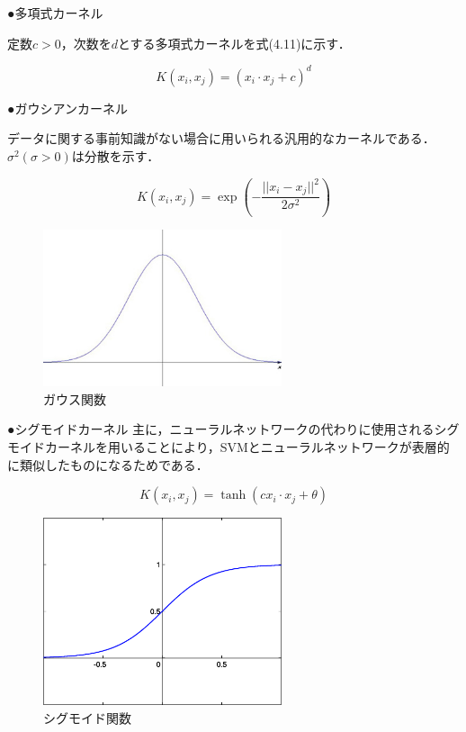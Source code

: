 ●多項式カーネル

定数$c>0$，次数を$d$とする多項式カーネルを式(4.11)に示す．

\begin{equation}
      K(x_i,x_j) = (x_i \cdot x_j + c)^d
\end{equation}

●ガウシアンカーネル

データに関する事前知識がない場合に用いられる汎用的なカーネルである．$σ^2(σ>0)$は分散を示す．

\begin{equation}
      K(x_i,x_j) = \exp(-\frac{||x_i - x_j||^2}{2σ^2})
\end{equation}

\begin{figure}[htbp]
  \begin{center}
    \includegraphics[clip,width=7.0cm]{./images/gaus.png}
    \caption{ガウス関数}
    \label{fig:gaus}
  \end{center}
\end{figure}

\newpage

●シグモイドカーネル
主に，ニューラルネットワークの代わりに使用されるシグモイドカーネルを用いることにより，SVMとニューラルネットワークが表層的に類似したものになるためである．

\begin{equation}
      K(x_i,x_j) = \tanh(cx_i \cdot x_j + θ)
\end{equation}

\begin{figure}[htbp]
  \begin{center}
    \includegraphics[clip,width=7.0cm]{./images/sigu.png}
    \caption{シグモイド関数}
    \label{fig:sigu}
  \end{center}
\end{figure}


